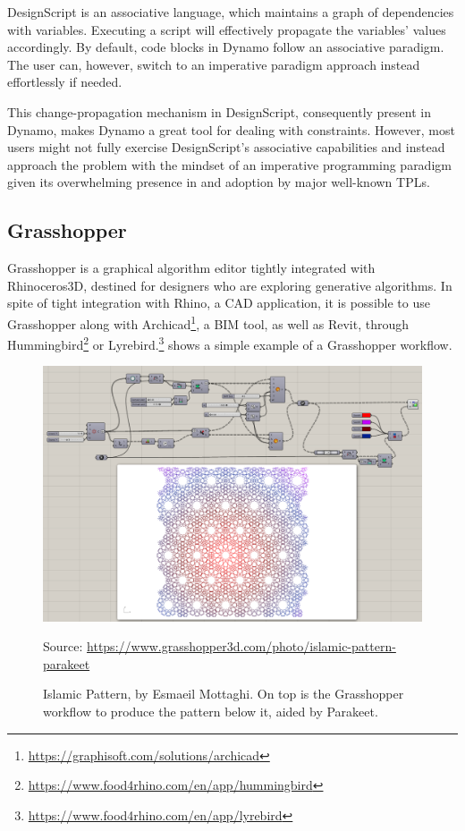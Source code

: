 DesignScript is an associative language, which maintains a graph of dependencies
with variables.  Executing a script will effectively propagate the variables'
values accordingly.  By default, code blocks in Dynamo follow an associative
paradigm.  The user can, however, switch to an imperative paradigm approach
instead effortlessly if needed.

This change-propagation mechanism in DesignScript, consequently present in
Dynamo, makes Dynamo a great tool for dealing with constraints.  However, most
users might not fully exercise DesignScript's associative capabilities and
instead approach the problem with the mindset of an imperative programming
paradigm given its overwhelming presence in and adoption by major well-known
\acp{TPL}.

\subsection{Grasshopper}%
\label{sec:related.ad.grasshopper}

Grasshopper is a graphical algorithm editor tightly integrated with
Rhinoceros3D, destined for designers who are exploring generative algorithms.
In spite of tight integration with Rhino, a \ac{CAD} application, it is possible
to use Grasshopper along with
Archicad\footnote{\url{https://graphisoft.com/solutions/archicad}}, a \ac{BIM}
tool, as well as Revit, through
Hummingbird\footnote{\url{https://www.food4rhino.com/en/app/hummingbird}} or
Lyrebird.\footnote{\url{https://www.food4rhino.com/en/app/lyrebird}}
 shows a simple example of a
Grasshopper workflow.

\begin{figure}[htb]
  \includegraphics[width=\linewidth]{fig/grasshopper-islamic-pattern}
  \begin{minipage}{\linewidth}
  \scriptsize Source:
  \url{https://www.grasshopper3d.com/photo/islamic-pattern-parakeet}
  \end{minipage}
  \caption[Islamic Pattern in Grasshopper using Parakeet]{
    Islamic Pattern, by Esmaeil Mottaghi.  On top is the Grasshopper workflow to
    produce the pattern below it, aided by
    Parakeet.\footnotemark}%
  \label{fig:related.ad.grasshopper.islamic-pattern}
\end{figure}

